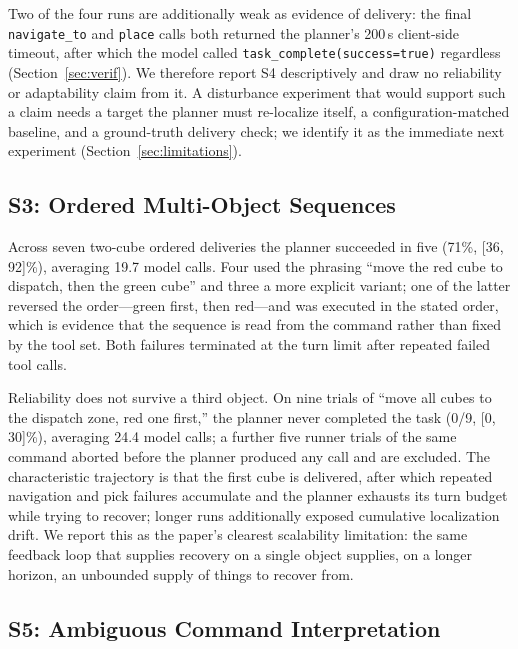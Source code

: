 \documentclass[conference]{IEEEtran}
\begin{document}
Two of the four runs are additionally weak as evidence of delivery: the
final \texttt{navigate\_to} and \texttt{place} calls both returned the
planner's 200\,s client-side timeout, after which the model called
\texttt{task\_complete(success=true)} regardless
(Section~\ref{sec:verif}). We therefore report S4 descriptively and draw no
reliability or adaptability claim from it. A disturbance experiment that
would support such a claim needs a target the planner must re-localize
itself, a configuration-matched baseline, and a ground-truth delivery
check; we identify it as the immediate next experiment
(Section~\ref{sec:limitations}).

\subsection{S3: Ordered Multi-Object Sequences}

Across seven two-cube ordered deliveries the planner succeeded in five
(71\%, [36, 92]\%), averaging 19.7 model calls. Four used the phrasing
``move the red cube to dispatch, then the green cube'' and three a more
explicit variant; one of the latter reversed the order---green first, then
red---and was executed in the stated order, which is evidence that the
sequence is read from the command rather than fixed by the tool set. Both
failures terminated at the turn limit after repeated failed tool calls.

Reliability does not survive a third object. On nine trials of ``move all
cubes to the dispatch zone, red one first,'' the planner never completed
the task (0/9, [0, 30]\%), averaging 24.4 model calls; a further five
runner trials of the same command aborted before the planner produced any
call and are excluded. The characteristic trajectory is that the first cube
is delivered, after which repeated navigation and pick failures accumulate
and the planner exhausts its turn budget while trying to recover; longer
runs additionally exposed cumulative localization drift. We report this as
the paper's clearest scalability limitation: the same feedback loop that
supplies recovery on a single object supplies, on a longer horizon, an
unbounded supply of things to recover from.

\subsection{S5: Ambiguous Command Interpretation}
\end{document}
